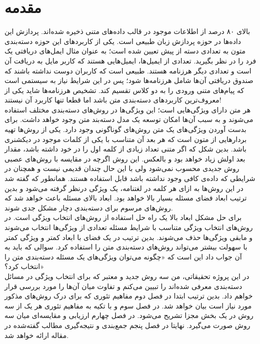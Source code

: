 \chapter{مقدمه}
بالای ۸۰ درصد از اطلاعات موجود در قالب داده‌های متنی ذخیره شده‌اند\cite{ghareb2016hybrid}. پردازش این داده‌ها در حوزه پردازش زبان طبیعی است. یکی از کاربردهای این حوزه دسته‌بندی متون به تعدادی دسته از پیش تعیین شده است؛ به عنوان مثال ایمل‌های دریافتی یک فرد را در نظر بگیرید. تعدادی از ایمیل‌ها، ایمیل‌هایی هستند که کاربر مایل به دریافت آن است و تعدادی دیگر هرزنامه هستند. طبیعی است که کاربران دوست نداشته باشند که صندوق دریافتی آن‌ها شامل هرزنامه‌ها شود؛ پس در این شرایط نیاز به سیستمی است که پیام‌های متنی ورودی را به دو کلاس تقسیم کند. تشخیص هرزنامه‌ها شاید یکی از معروف‌ترین کاربرد‌های دسته‌بندی متن باشد اما قطعا تنها کاربرد آن نیستند!
\\

هر متن دارای ویژگی‌هایی است؛ این ویژگی‌ها در روش‌های دسته‌بندی مختلف استفاده می‌شوند و به سبب آن‌ها امکان توسعه یک مدل دسته‌بند متن وجود خواهد داشت. برای بدست آوردن ویژگی‌های یک متن روش‌های گوناگونی وجود دارد. یکی از روش‌ها تهیه بردارهایی از متون است که هر بعد آن متناسب با یکی از کلمات موجود در دیکشنری باشد. بدین شکل که اگر متنی تعداد زیادی از کلمه اول را در خود داشته باشد، مقدار بعد اولش زیاد خواهد بود و بالعکس. این روش اگرچه در مقایسه با روش‌های عصبی روش جدیدی محسوب نمی‌شود ولی با این حال چندان قدیمی نیست و همچنان در شرایطی که داده‌‌ی کافی وجود نداشته باشد قابل استفاده هستند. همانطور که گفته شد در این روش‌ها به ازای هر کلمه در لغتنامه، یک ویژگی درنظر گرفته می‌شود و بدین ترتیب ابعاد فضای مسئله بسیار بالا خواهد بود. ابعاد بالای مسئله باعث خواهد شد که روش‌های مرسوم برای دسته‌بندی دچار مشکل جدی شوند.
\\

برای حل مشکل ابعاد بالا یک راه حل استفاده از روش‌های انتخاب ویژگی است. در روش‌های انتخاب ویژگی متناسب با شرایط مسئله تعدادی از ویژگی‌ها انتخاب می‌شوند و مابقی ویژگی‌ها حذف می‌شوند. بدین ترتیب در یک فضای با ابعاد کمتر و ویژگی کمتر با سهولت بیشتر می‌تواند روش‌های دسته‌بندی متن را استفاده کرد. سوالی که باید به آن جواب داد این است که «چگونه می‌توان ویژگی‌های یک مسئله دسته‌بندی متن را انتخاب کرد؟»
\\

در این پروژه تحقیقاتی، من سه روش جدید و معتبر \cite{uysal2016improved} \cite{labani2018novel} \cite{ghareb2016hybrid}که برای انتخاب ویژگی در مسائل دسته‌بندی معرفی شده‌اند را تبیین می‌کنم و تفاوت میان آن‌ها را مورد بررسی قرار خواهم داد. بدین ترتیب ابتدا در فصل دوم مفاهیم تئوری که برای درک روش‌های مذکور مورد نیاز است بیان خواهد شد. در فصل سوم و با تکیه به مفاهیم تئوری هر یک از سه روش در یک بخش مجزا تشریح می‌شود. در فصل چهارم ارزیابی و مقایسه‌ای میان سه روش صورت می‌گیرد. نهایتا در فصل پنجم جمع‌بندی و نتیجه‌گیری مطالب گفته‌شده در مقاله ارائه خواهد شد. 